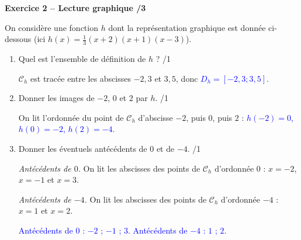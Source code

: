 \documentclass[10pt,a4paper]{article}
\begin{document}
\textbf{Exercice 2 -- Lecture graphique \hfill /3}

On considère une fonction \(h\) dont la représentation graphique est donnée ci-dessous (ici \(h(x)=\frac{1}{3}(x+2)(x+1)(x-3)\)).

\begin{center}
\end{center}

\begin{enumerate}
    \item Quel est l'ensemble de définition de \(h\) ? \hfill /1

    \(\mathcal{C}_h\) est tracée entre les abscisses \(-2{,}3\) et \(3{,}5\), donc \textcolor{blue}{\(D_h=[-2{,}3;3{,}5]\)}.
    \item Donner les images de \(-2\), \(0\) et \(2\) par \(h\). \hfill /1

    On lit l'ordonnée du point de \(\mathcal{C}_h\) d'abscisse \(-2\), puis \(0\), puis \(2\) :
    \textcolor{blue}{\(h(-2)=0\), \(h(0)=-2\), \(h(2)=-4\)}.
    \item Donner les éventuels antécédents de \(0\) et de \(-4\). \hfill /1

    \emph{Antécédents de \(0\).} On lit les abscisses des points de \(\mathcal{C}_h\) d'ordonnée \(0\) : \(x=-2\), \(x=-1\) et \(x=3\).

    \emph{Antécédents de \(-4\).} On lit les abscisses des points de \(\mathcal{C}_h\) d'ordonnée \(-4\) : \(x=1\) et \(x=2\).

    \textcolor{blue}{Antécédents de \(0\) : \(-2\) ; \(-1\) ; \(3\). Antécédents de \(-4\) : \(1\) ; \(2\).}
\end{enumerate}
\end{document}

